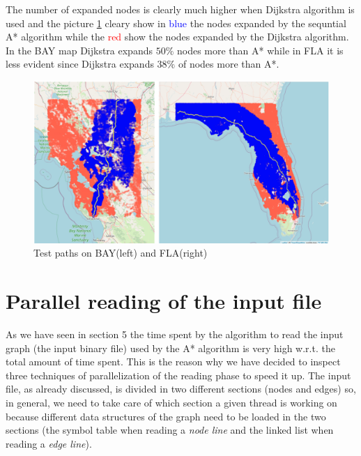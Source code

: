 \documentclass[twocolumn, switch]{article} %
\begin{document}
The number of expanded nodes is clearly much higher when Dijkstra algorithm is used and the picture
\ref{astardijkstra} cleary show in \textcolor{blue}{blue} the nodes expanded by the sequntial A* algorithm
while the \textcolor{red}{red} show the nodes expanded by the Dijkstra algorithm. In the BAY map Dijkstra
expands $50\%$ nodes more than A* while in FLA it is less evident since Dijkstra expands $38\%$ of nodes
more than A*.
\begin{figure}[ht!]
  \centering
  \includegraphics[width=1\linewidth]{dijkstra_astar.png}
  \caption{Test paths on BAY(left) and FLA(right)}
  \label{astardijkstra}
\end{figure}

\section{Parallel reading of the input file}
As we have seen in section 5 the time spent by the algorithm to read the input graph
(the input binary file) used by the A* algorithm is very high w.r.t. the total
amount of time spent. This is the reason why we have decided to inspect three techniques of
parallelization of the reading phase to speed it up. The input file, as already discussed,
is divided in two different sections (nodes and edges) so, in general, we need to take care of which
section a given thread is working on because different data structures of the graph need to
be loaded in the two sections (the symbol table when reading a \textit{node line} and the linked list when
reading a \textit{edge line}).
\end{document}
